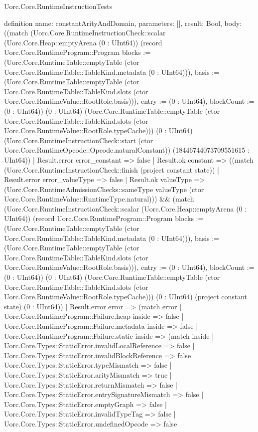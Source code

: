 \begin{lexlean}{Uorc.Core.RuntimeInstructionTests}
\begin{semanticmodule}
definition{
  name: constantArityAndDomain,
  parameters: [],
  result: Bool,
  body: ((match (Uorc.Core.RuntimeInstructionCheck::scalar (Uorc.Core.Heap::emptyArena (0 : UInt64)) (record Uorc.Core.RuntimeProgram::Program {blocks := (Uorc.Core.RuntimeTable::emptyTable (ctor Uorc.Core.RuntimeTable::TableKind.metadata (0 : UInt64))), basis := (Uorc.Core.RuntimeTable::emptyTable (ctor Uorc.Core.RuntimeTable::TableKind.slots (ctor Uorc.Core.RuntimeValue::RootRole.basis))), entry := (0 : UInt64), blockCount := (0 : UInt64)}) (0 : UInt64) (Uorc.Core.RuntimeTable::emptyTable (ctor Uorc.Core.RuntimeTable::TableKind.slots (ctor Uorc.Core.RuntimeValue::RootRole.typeCache))) (0 : UInt64) (Uorc.Core.RuntimeInstructionCheck::start (ctor Uorc.Core.RuntimeOpcode::Opcode.naturalConstant)) (18446744073709551615 : UInt64))
    | Result.error error_constant => false
    | Result.ok constant => ((match (Uorc.Core.RuntimeInstructionCheck::finish (project constant state))
      | Result.error error_valueType => false
      | Result.ok valueType => (Uorc.Core.RuntimeAdmissionChecks::sameType valueType (ctor Uorc.Core.RuntimeValue::RuntimeType.natural))) && (match (Uorc.Core.RuntimeInstructionCheck::scalar (Uorc.Core.Heap::emptyArena (0 : UInt64)) (record Uorc.Core.RuntimeProgram::Program {blocks := (Uorc.Core.RuntimeTable::emptyTable (ctor Uorc.Core.RuntimeTable::TableKind.metadata (0 : UInt64))), basis := (Uorc.Core.RuntimeTable::emptyTable (ctor Uorc.Core.RuntimeTable::TableKind.slots (ctor Uorc.Core.RuntimeValue::RootRole.basis))), entry := (0 : UInt64), blockCount := (0 : UInt64)}) (0 : UInt64) (Uorc.Core.RuntimeTable::emptyTable (ctor Uorc.Core.RuntimeTable::TableKind.slots (ctor Uorc.Core.RuntimeValue::RootRole.typeCache))) (0 : UInt64) (project constant state) (0 : UInt64))
      | Result.error error => (match error
        | Uorc.Core.RuntimeProgram::Failure.heap inside => false
        | Uorc.Core.RuntimeProgram::Failure.metadata inside => false
        | Uorc.Core.RuntimeProgram::Failure.static inside => (match inside
          | Uorc.Core.Types::StaticError.invalidLocalReference => false
          | Uorc.Core.Types::StaticError.invalidBlockReference => false
          | Uorc.Core.Types::StaticError.typeMismatch => false
          | Uorc.Core.Types::StaticError.arityMismatch => true
          | Uorc.Core.Types::StaticError.returnMismatch => false
          | Uorc.Core.Types::StaticError.entrySignatureMismatch => false
          | Uorc.Core.Types::StaticError.emptyGraph => false
          | Uorc.Core.Types::StaticError.invalidTypeTag => false
          | Uorc.Core.Types::StaticError.undefinedOpcode => false
}
\end{semanticmodule}
\end{lexlean}
